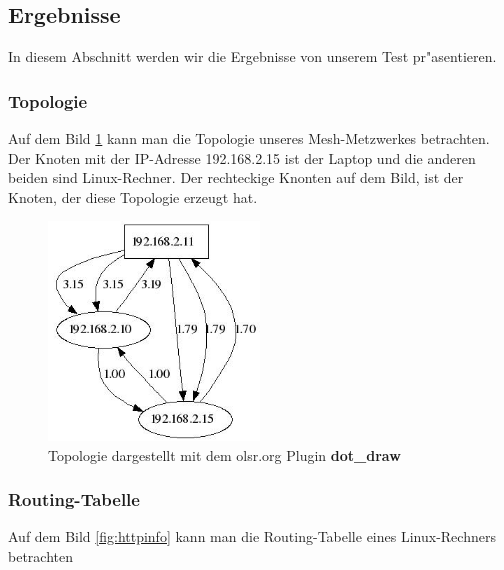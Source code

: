 \subsection{Ergebnisse}

In diesem Abschnitt werden wir die Ergebnisse von unserem Test pr"asentieren.

\subsubsection{Topologie}

Auf dem Bild \ref{fig:Topology} kann man die Topologie unseres Mesh-Metzwerkes
betrachten. Der Knoten mit der IP-Adresse 192.168.2.15 ist der Laptop und
die anderen beiden sind Linux-Rechner. Der rechteckige Knonten auf dem Bild, ist
der Knoten, der diese Topologie erzeugt hat.

\begin{figure}[H]
\centering
\includegraphics[width=0.5\textwidth]{images/Topology.jpg}
\caption{Topologie dargestellt mit dem olsr.org Plugin \textbf{dot\_draw}}
\label{fig:Topology}
\end{figure}

\subsubsection{Routing-Tabelle}

Auf dem Bild \ref{fig:httpinfo} kann man die Routing-Tabelle
eines Linux-Rechners betrachten


